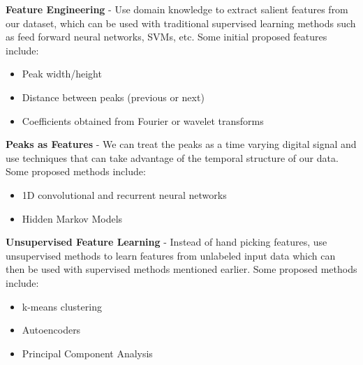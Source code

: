 \documentclass{article}
\begin{document}
\textbf{Feature Engineering} - Use domain knowledge to extract salient
  features from our dataset, which can be used with traditional supervised
  learning methods such as feed forward neural networks, SVMs, etc.  Some
  initial proposed features include:
  \begin{itemize}
  \item Peak width/height
  \item Distance between peaks (previous or next)
  \item Coefficients obtained from Fourier or wavelet transforms
  \end{itemize}

  \textbf{Peaks as Features} - We can treat the peaks as a time varying digital
  signal and use techniques that can take advantage of the temporal structure
  of our data.  Some proposed methods include:
  \begin{itemize}
  \item 1D convolutional and recurrent neural networks
  \item Hidden Markov Models
  \end{itemize}

  \textbf{Unsupervised Feature Learning} - Instead of hand picking features,
  use unsupervised methods to learn features from unlabeled input data which
  can then be used with supervised methods mentioned earlier.  Some proposed
  methods include:
  \begin{itemize}
  \item k-means clustering
  \item Autoencoders
  \item Principal Component Analysis
  \end{itemize}




\end{document}
